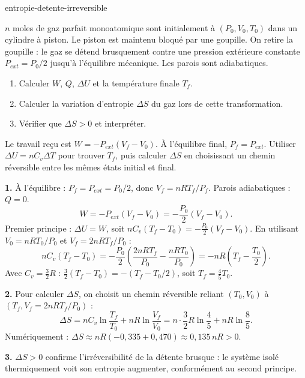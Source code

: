 \begin{exo}{entropie-detente-irreversible}

$n$ moles de gaz parfait monoatomique sont initialement à $(P_0, V_0, T_0)$ dans un cylindre à piston. Le piston est maintenu bloqué par une goupille. On retire la goupille : le gaz se détend brusquement contre une pression extérieure constante $P_{ext} = P_0/2$ jusqu'à l'équilibre mécanique. Les parois sont adiabatiques.

\begin{enumerate}
  \item Calculer $W$, $Q$, $\Delta U$ et la température finale $T_f$.
  \item Calculer la variation d'entropie $\Delta S$ du gaz lors de cette transformation.
  \item Vérifier que $\Delta S > 0$ et interpréter.
\end{enumerate}

\begin{indication}
Le travail reçu est $W = -P_{ext}(V_f - V_0)$. À l'équilibre final, $P_f = P_{ext}$. Utiliser $\Delta U = nC_v \Delta T$ pour trouver $T_f$, puis calculer $\Delta S$ en choisissant un chemin réversible entre les mêmes états initial et final.
\end{indication}

\begin{solution}
\textbf{1.} À l'équilibre : $P_f = P_{ext} = P_0/2$, donc $V_f = nRT_f/P_f$.
Parois adiabatiques : $Q = 0$.
$$W = -P_{ext}(V_f - V_0) = -\frac{P_0}{2}(V_f - V_0).$$
Premier principe : $\Delta U = W$, soit $nC_v(T_f - T_0) = -\frac{P_0}{2}(V_f - V_0)$.
En utilisant $V_0 = nRT_0/P_0$ et $V_f = 2nRT_f/P_0$ :
$$nC_v(T_f - T_0) = -\frac{P_0}{2}\!\left(\frac{2nRT_f}{P_0} - \frac{nRT_0}{P_0}\right) = -nR\!\left(T_f - \frac{T_0}{2}\right).$$
Avec $C_v = \frac{3}{2}R$ : $\frac{3}{2}(T_f - T_0) = -(T_f - T_0/2)$, soit $T_f = \frac{4}{5}T_0$.

\textbf{2.} Pour calculer $\Delta S$, on choisit un chemin réversible reliant $(T_0, V_0)$ à $(T_f, V_f = 2nRT_f/P_0)$ :
$$\Delta S = nC_v \ln\frac{T_f}{T_0} + nR\ln\frac{V_f}{V_0} = n\cdot\frac{3}{2}R\ln\frac{4}{5} + nR\ln\frac{8}{5}.$$
Numériquement : $\Delta S \approx n R(-0{,}335 + 0{,}470) \approx 0{,}135\,nR > 0$.

\textbf{3.} $\Delta S > 0$ confirme l'irréversibilité de la détente brusque : le système isolé thermiquement voit son entropie augmenter, conformément au second principe.
\end{solution}

\end{exo}

